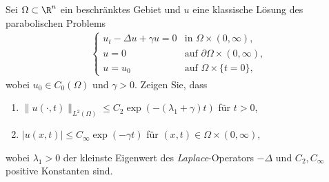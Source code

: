 
\begin{exercise}

Sei $\Omega \subset \R^n$ ein beschränktes Gebiet und $u$ eine klassische Lösung
des parabolischen Problems
\begin{align*}
  \begin{cases}
      u_t - \Delta u + \gamma u = 0 & \text{in } \Omega \times (0,\infty), \\
      u = 0 & \text{auf } \partial\Omega \times (0,\infty), \\
      u = u_0 & \text{auf } \Omega \times \{t = 0\},
  \end{cases}
\end{align*}
wobei $u_0 \in C_0(\Omega)$ und $\gamma > 0$. Zeigen Sie, dass
\begin{enumerate}[label = (\roman*)]
  \item $\|u(\cdot,t)\|_{L^2(\Omega)} \leq C_2\exp(-(\lambda_1 + \gamma)t)$ für $t > 0$,
  \item $|u(x,t)| \leq C_{\infty}\exp(-\gamma t)$ für $(x,t) \in \Omega \times (0,\infty)$,
\end{enumerate}
wobei $\lambda_1 > 0$ der kleinste Eigenwert des \textit{Laplace}-Operators $-\Delta$
und $C_2,C_{\infty}$ positive Konstanten sind.
\end{exercise}


\begin{solution}

\phantom{}

\end{solution}

